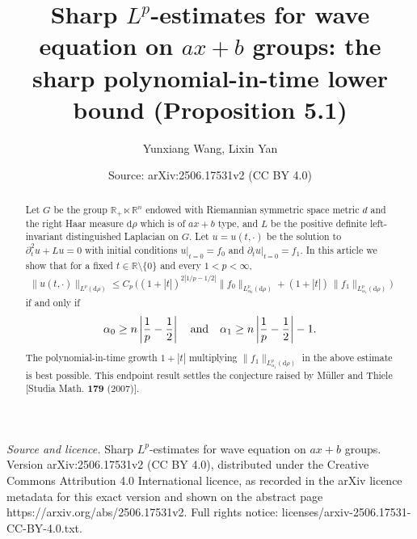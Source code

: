 \documentclass[10pt,a4paper]{amsart}
\title[Sharp lower bound for $\sin(t\sqrt{L})/\sqrt{L}$ on $ax+b$ groups (Proposition 5.1)]{Sharp $L^p$-estimates for wave equation on $ax+b$ groups: the sharp polynomial-in-time lower bound (Proposition 5.1)}
\author{Yunxiang Wang, Lixin Yan}
\date{Source: arXiv:2506.17531v2 (CC BY 4.0)}
\begin{document}
\begin{abstract}
Let $G$ be the group $\mathbb{R}_+\ltimes \mathbb{R}^n$ endowed with Riemannian symmetric space metric $d$ and the right Haar measure $\mathrm{d} \rho$ which is of $ax+b$ type, and $L$ be the positive definite left-invariant distinguished Laplacian on $G$. Let $u=u(t,\cdot)$ be the solution to $\partial_t^2u+Lu=0$ with initial conditions $u|_{t=0}=f_0$ and $\partial_tu|_{t=0}=f_1$. In this article we show that for a fixed $t\in\mathbb{R}\setminus\{0\}$ and every $1<p<\infty$, 
\begin{align*}
\|u(t,\cdot)\|_{L^p(\mathrm{d}\rho)}\leq C_p\,\Big( (1+|t|)^{2|1/p-1/2|}\|f_0\|_{L^p_{\alpha_0}(\mathrm{d}\rho)}+(1+|t|)\,\|f_1\|_{L^p_{\alpha_1}(\mathrm{d}\rho)}\Big) 
\end{align*}
if and only if
\begin{align*}
\alpha_0\geq n\left|{1\over p}-{1\over2}\right| \quad \mbox{and}
\quad \alpha_1\geq n\left|{1\over p}-{1\over2}\right|-1.
\end{align*} 
The polynomial-in-time growth $1+|t|$ multiplying $\|f_1\|_{L^p_{\alpha_1}(\mathrm{d}\rho)}$ in the above estimate is best possible. 
This endpoint result settles the conjecture raised by M\"{u}ller and Thiele [Studia Math. \textbf{179} (2007)].


\end{abstract}
\maketitle

\noindent\emph{Source and licence.} Sharp $L^p$-estimates for wave equation on $ax+b$ groups. Version arXiv:2506.17531v2 (CC BY 4.0), distributed under the Creative Commons Attribution 4.0 International licence, as recorded in the arXiv licence metadata for this exact version and shown on the abstract page https://arxiv.org/abs/2506.17531v2. Full rights notice: licenses/arxiv-2506.17531-CC-BY-4.0.txt.\par\smallskip
\end{document}
